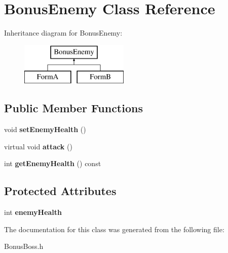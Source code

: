 \hypertarget{class_bonus_enemy}{\section{Bonus\+Enemy Class Reference}
\label{class_bonus_enemy}
}
Inheritance diagram for Bonus\+Enemy\+:\begin{figure}[H]
\begin{center}
\leavevmode
\includegraphics[height=2.000000cm]{class_bonus_enemy}
\end{center}
\end{figure}
\subsection*{Public Member Functions}
\begin{DoxyCompactItemize}
\item 
\hypertarget{class_bonus_enemy_ab49823c6432f006fe18018f1e39959e0}{void {\bfseries set\+Enemy\+Health} ()}\label{class_bonus_enemy_ab49823c6432f006fe18018f1e39959e0}

\item 
\hypertarget{class_bonus_enemy_a5bcfb846c3ee4c2254f7508473ec5659}{virtual void {\bfseries attack} ()}\label{class_bonus_enemy_a5bcfb846c3ee4c2254f7508473ec5659}

\item 
\hypertarget{class_bonus_enemy_a4b5f78ccb9e79885033ba60f893d1491}{int {\bfseries get\+Enemy\+Health} () const }\label{class_bonus_enemy_a4b5f78ccb9e79885033ba60f893d1491}

\end{DoxyCompactItemize}
\subsection*{Protected Attributes}
\begin{DoxyCompactItemize}
\item 
\hypertarget{class_bonus_enemy_ae09f90f7cdb5c71740d9d2da96c437ee}{int {\bfseries enemy\+Health}}\label{class_bonus_enemy_ae09f90f7cdb5c71740d9d2da96c437ee}

\end{DoxyCompactItemize}


The documentation for this class was generated from the following file\+:\begin{DoxyCompactItemize}
\item 
Bonus\+Boss.\+h\end{DoxyCompactItemize}
